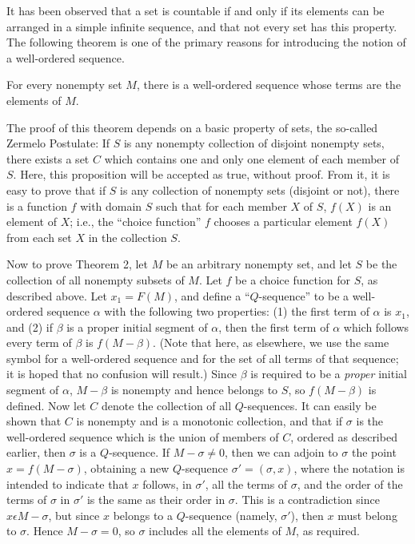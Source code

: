 \documentclass{article}
\newcounter{theoremcount}
\newenvironment{theorem}
{ \begin{description} \refstepcounter{theoremcount} \item[Theorem \arabic{theoremcount}:] }
{ \end{description} }
\begin{document}
It has been observed that a set is countable if and only if its elements can be arranged in a simple infinite sequence, and that not every set has this property. The following theorem is one of the primary reasons for introducing the notion of a well-ordered sequence.

\begin{theorem} %
For every nonempty set $M$, there is a well-ordered sequence whose terms are the elements of $M$.
\end{theorem}

The proof of this theorem depends on a basic property of sets, the so-called Zermelo Postulate: If $S$ is any nonempty collection of disjoint nonempty sets, there exists a set $C$ which contains one and only one element of each member of $S$. Here, this proposition will be accepted as true, without proof. From it, it is easy to prove that if $S$ is any collection of nonempty sets (disjoint or not), there is a function $f$ with domain $S$ such that for each member $X$ of $S$, $f(X)$ is an element of $X$; i.e., the ``choice function'' $f$ chooses a particular element $f(X)$ from each set $X$ in the collection $S$.

Now to prove Theorem 2, let $M$ be an arbitrary nonempty set, and let $S$ be the collection of all nonempty subsets of $M$. Let $f$ be a choice function for $S$, as described above. Let $x_1 = F(M)$, and define a ``$Q$-sequence'' to be a well-ordered sequence $\alpha$ with the following two properties: (1) the first term of $\alpha$ is $x_1$, and (2) if $\beta$ is a proper initial segment of $\alpha$, then the first term of $\alpha$ which follows every term of $\beta$ is $f(M - \beta)$. (Note that here, as elsewhere, we use the same symbol for a well-ordered sequence and for the set of all terms of that sequence; it is hoped that no confusion will result.) Since $\beta$ is required to be a \emph{proper} initial segment of $\alpha$, $M - \beta$ is nonempty and hence belongs to $S$, so $f(M - \beta)$ is defined. Now let $C$ denote the collection of all $Q$-sequences. It can easily be shown that $C$ is nonempty and is a monotonic collection, and that if $\sigma$ is the well-ordered sequence which is the union of members of $C$, ordered as described earlier, then $\sigma$ is a $Q$-sequence. If $M - \sigma \neq 0$, then we can adjoin to $\sigma$ the point $x = f(M - \sigma)$, obtaining a new $Q$-sequence $\sigma' = (\sigma, x)$, where the notation is intended to indicate that $x$ follows, in $\sigma'$, all the terms of $\sigma$, and the order of the terms of $\sigma$ in $\sigma'$ is the same as their order in $\sigma$. This is a contradiction since $x \epsilon M - \sigma$, but since $x$ belongs to a $Q$-sequence (namely, $\sigma'$), then $x$ must belong to $\sigma$. Hence $M - \sigma = 0$, so $\sigma$ includes all the elements of $M$, as required.
\end{document}
